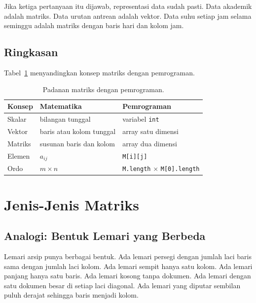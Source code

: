 \documentclass[11pt,a4paper]{article}
\begin{document}
Jika ketiga pertanyaan itu dijawab, representasi data sudah pasti. Data akademik adalah matriks. Data urutan antrean adalah vektor. Data suhu setiap jam selama seminggu adalah matriks dengan baris hari dan kolom jam.

\subsection{Ringkasan}

Tabel~\ref{tab:matriks-programming} menyandingkan konsep matriks dengan pemrograman.

\begin{table}[H]
	\centering
	\caption{Padanan matriks dengan pemrograman.}
	\label{tab:matriks-programming}
	\small
	\begin{tabularx}{\textwidth}{l X X}
		\toprule
		Konsep  & Matematika               & Pemrograman                                     \\
		\midrule
		Skalar  & bilangan tunggal         & variabel \texttt{int}                           \\
		Vektor  & baris atau kolom tunggal & array satu dimensi                              \\
		Matriks & susunan baris dan kolom  & array dua dimensi                               \\
		Elemen  & $a_{ij}$                 & \texttt{M[i][j]}                                \\
		Ordo    & $m \times n$             & \texttt{M.length} $\times$ \texttt{M[0].length} \\
		\bottomrule
	\end{tabularx}
\end{table}

\section{Jenis-Jenis Matriks}

\subsection{Analogi: Bentuk Lemari yang Berbeda}

Lemari arsip punya berbagai bentuk. Ada lemari persegi dengan jumlah laci baris sama dengan jumlah laci kolom. Ada lemari sempit hanya satu kolom. Ada lemari panjang hanya satu baris. Ada lemari kosong tanpa dokumen. Ada lemari dengan satu dokumen besar di setiap laci diagonal. Ada lemari yang diputar sembilan puluh derajat sehingga baris menjadi kolom.
\end{document}
